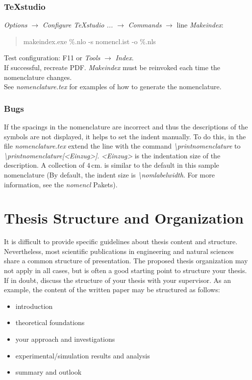 \subsubsection{TeXstudio}
\textit{Options} $\rightarrow$ \textit{Configure TeXstudio ...} $\rightarrow$ \textit{Commands} $\rightarrow$ line \textit{Makeindex}:
\begin{quotation}
makeindex.exe \%.nlo -s nomencl.ist -o \%.nls 
\end{quotation}

\noindent Test configuration: F11 or \textit{Tools} $\rightarrow$ \textit{Index}. \\
If successful, recreate PDF. \textit{Makeindex} must be reinvoked each time the nomenclature changes. \\
See \textit{nomenclature.tex} for examples of how to generate the nomenclature.

\subsubsection{Bugs}

If the spacings in the nomenclature are incorrect and thus the descriptions of the symbols are not displayed, it helps to set the indent manually.
To do this, in the file \textit{nomenclature.tex} extend the line with the command \textit{\textbackslash printnomenclature} to \textit{\textbackslash printnomenclature[<Einzug>]}.
\textit{<Einzug>} is the indentation size of the description.
A collection of $4\,\mathrm{cm}$. is similar to the default in this sample nomenclature (By default, the indent size is \textit{\textbackslash nomlabelwidth}.
For more information, see the \textit{nomencl} Pakets).

\section{Thesis Structure and Organization}
\label{hinweise:struktur}

It is difficult to provide specific guidelines about thesis content and structure.
Nevertheless, most scientific publications in engineering and
natural sciences share a common structure of presentation.
The proposed thesis organization may not apply in all cases, but is often a good
starting point to structure your thesis.
If in doubt, discuss the structure of your thesis with your supervisor.
As an example, the content of the written paper may be structured as follows:

\begin{itemize}
	\item introduction
	\item theoretical foundations
	\item your approach and investigations
	\item experimental/simulation results and analysis
	\item summary and outlook
\end{itemize}

